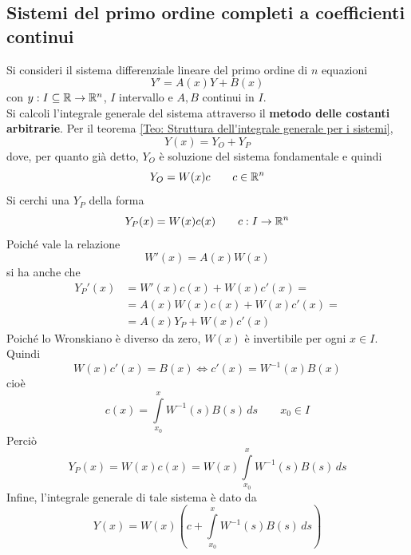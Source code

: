 \subsection{Sistemi del primo ordine completi a coefficienti continui}
Si consideri il sistema differenziale lineare del primo ordine di $n$ equazioni
\begin{equation}
    Y'=A(x)Y+B(x)
\end{equation}
con $y: I \subseteq \mathbb{R} \to \mathbb{R}^n$, $I$ intervallo e $A, B$ continui in $I$.\\
Si calcoli l'integrale generale del sistema attraverso il \textbf{metodo delle costanti arbitrarie}.
Per il teorema \ref{Teo: Struttura dell'integrale generale per i sistemi}, 
\begin{equation}
    Y(x)=Y_O+Y_P
\end{equation}
dove, per quanto già detto, $Y_O$ è soluzione del sistema fondamentale e quindi
\begin{equation}
    Y_O=W(x)c \qquad c \in \mathbb{R}^n
\end{equation}
Si cerchi una $Y_P$ della forma 
\begin{equation}
    Y_P(x)=W(x)c(x) \qquad c:I\to \mathbb{R}^n
\end{equation}
Poiché vale la relazione 
\begin{equation}
    W'(x)=A(x)W(x)
\end{equation}
si ha anche che
\begin{equation}
\begin{aligned}
    Y_P'(x)&=W'(x)c(x)+W(x)c'(x)=\\
    &=A(x)W(x)c(x)+W(x)c'(x)=\\
    &=A(x)Y_P+W(x)c'(x)
\end{aligned}
\end{equation}
Poiché lo Wronskiano è diverso da zero, $W(x)$ è invertibile per ogni $x \in I$. Quindi
\begin{equation}
    W(x)c'(x) =B(x) \iff c'(x)=W^{-1}(x)B(x)
\end{equation}
cioè
\begin{equation}
    c(x)= \int\limits_{x_0}^{x}{W^{-1}(s)B(s)}\, ds \qquad x_0 \in I
\end{equation}
Perciò
\begin{equation}
Y_P(x)=W(x)c(x)=W(x) \int\limits_{x_0}^{x}{W^{-1}(s)B(s)}\, ds
\end{equation}
Infine, l'integrale generale di tale sistema è dato da 
\begin{equation}
    Y(x)=W(x)\left(c+ \int\limits_{x_0}^{x}{W^{-1}(s)B(s)}\, ds\right)
\end{equation}
